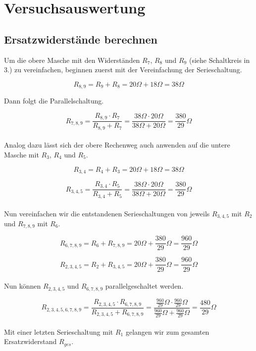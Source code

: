 \documentclass[a4paper,12pt]{article}
\begin{document}
\newpage

\section{Versuchsauswertung}

\subsection{Ersatzwiderstände berechnen}

Um die obere Masche mit den Widerständen $R_7$, $R_8$ und $R_9$ (siehe Schaltkreis in 3.) zu vereinfachen, beginnen zuerst mit der Vereinfachung der Serieschaltung.

$$R_{8,9} = R_9 + R_8 = 20 \Omega + 18 \Omega = 38 \Omega$$

Dann folgt die Parallelschaltung.

$$R_{7,8,9} = \frac{R_{8,9} \cdot R_7}{R_{8,9} + R_7} = \frac{38 \Omega \cdot 20 \Omega}{38 \Omega + 20 \Omega} = \frac{380}{29}\Omega$$\\

Analog dazu lässt sich der obere Rechenweg auch anwenden auf die untere Masche mit $R_3$, $R_4$ und $R_5$.

$$R_{3,4} = R_4 + R_3 = 20 \Omega + 18 \Omega = 38 \Omega$$

$$R_{3,4,5} = \frac{R_{3,4} \cdot R_5}{R_{3,4} + R_5} = \frac{38 \Omega \cdot 20 \Omega}{38 \Omega + 20 \Omega} = \frac{380}{29}\Omega$$\\

Nun vereinfachen wir die entstandenen Serieschaltungen von jeweils $R_{3,4,5}$ mit $R_2$ und $R_{7,8,9}$ mit $R_6$.

$$R_{6,7,8,9} = R_6 + R_{7,8,9} = 20 \Omega + \frac{380}{29} \Omega = \frac{960}{29} \Omega$$

$$R_{2,3,4,5} = R_2 + R_{3,4,5} = 20 \Omega + \frac{380}{29} \Omega = \frac{960}{29} \Omega$$\\

Nun können $R_{2,3,4,5}$ und $R_{6,7,8,9}$ parallelgeschaltet werden.

$$R_{2,3,4,5,6,7,8,9} = \frac{R_{2,3,4,5} \cdot R_{6,7,8,9}}{R_{2,3,4,5} + R_{6,7,8,9}} = \frac{\frac{960}{29}\Omega \cdot \frac{960}{29}\Omega}{\frac{960}{29}\Omega + \frac{960}{29}\Omega} = \frac{480}{29}\Omega$$\\

Mit einer letzten Serieschaltung mit $R_1$ gelangen wir zum gesamten Ersatzwiderstand $R_{ges}$.
\end{document}
